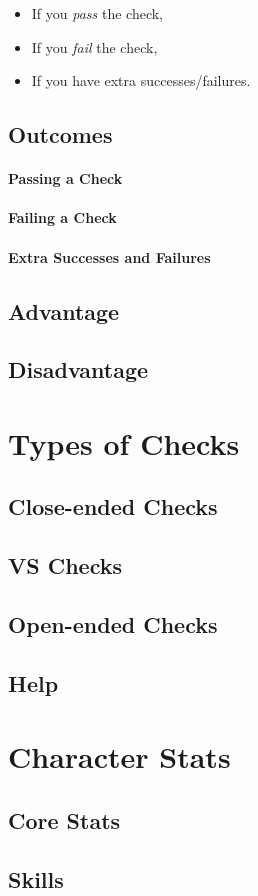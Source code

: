\documentclass[../main.tex]{subfiles}
\begin{document}
    \begin{itemize}
        \item If you {\em pass} the check,
        \item If you {\em fail} the check,
        \item If you have extra successes/failures.
    \end{itemize}

    \pagebreak

    \subsection{Outcomes}

    \paragraph{Passing a Check}

    \paragraph{Failing a Check}

    \paragraph{Extra Successes and Failures}
    
    \subsection{Advantage}

    \subsection{Disadvantage}

    \section{Types of Checks}

    \subsection{Close-ended Checks}

    \subsection{VS Checks}

    \subsection{Open-ended Checks}

    \subsection{Help}

    \section{Character Stats}

    \subsection{Core Stats}

    \subsection{Skills}
\end{document}
